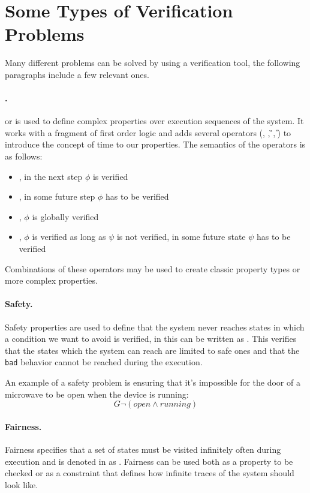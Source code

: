 \section{Some Types of Verification Problems}
Many different problems can be solved by using a verification tool, the following paragraphs include a few relevant ones.

\paragraph*{\ltl{}.} \ltl{} or \LTL{} is used to define complex properties over execution sequences of the system.
It works with a fragment of first order logic and adds several operators (\X{}, \F{}, \G{}, \U{}) to introduce the concept of time to our properties.
The semantics of the operators is as follows:
\begin{itemize}
    \item \fX{}, in the next step $\phi$ is verified
    \item \fF{}, in some future step $\phi$ has to be verified
    \item \fG{}, $\phi$ is globally verified
    \item \fU{}, $\phi$ is verified as long as $\psi$ is not verified, in some future state $\psi$ has to be verified
\end{itemize}

Combinations of these operators may be used to create classic property types or more complex properties.

\paragraph*{Safety.} Safety properties are used to define that the system never reaches states in which a condition we want to avoid is verified, in \ltl{} this can be written as \fsafe{}.
This verifies that the states which the system can reach are limited to safe ones and that the \texttt{bad} behavior cannot be reached during the execution.

An example of a safety problem is ensuring that it's impossible for the door of a microwave to be open when the device is running:
\[
    G \lnot (\mathit{open} \land \mathit{running})
\]

\paragraph*{Fairness.} Fairness specifies that a set of states must be visited infinitely often during execution and is denoted in \ltl{} as \ffair{}.
Fairness can be used both as a property to be checked or as a constraint that defines how infinite traces of the system should look like.

